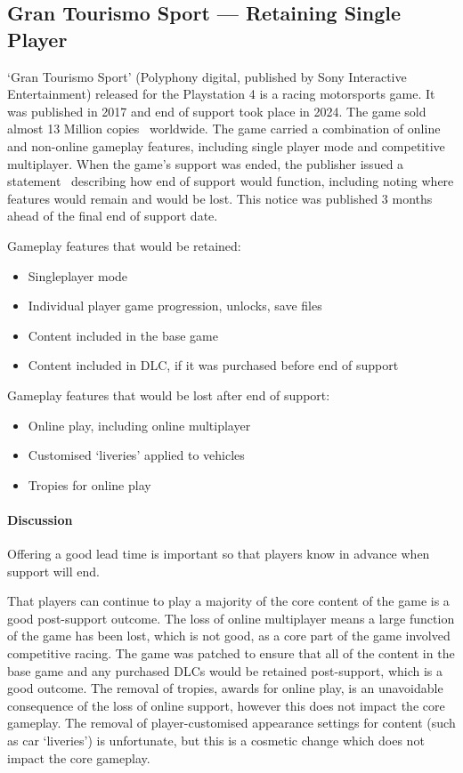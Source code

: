\subsection{Gran Tourismo Sport --- Retaining Single Player}
`Gran Tourismo Sport' (Polyphony digital, published by Sony Interactive Entertainment) released for the Playstation 4 is a racing motorsports game.
It was published in 2017 and end of support took place in 2024.
The game sold almost 13 Million copies~\cite{gtsport-sales-2023} worldwide.
The game carried a combination of online and non-online gameplay features, including single player mode and competitive multiplayer.
When the game's support was ended, the publisher issued a statement~\cite{gtsport-eos-2023} describing how end of support would function,
including noting where features would remain and would be lost.
This notice was published 3 months ahead of the final end of support date.

Gameplay features that would be retained:
\begin{itemize}
    \item Singleplayer mode
    \item Individual player game progression, unlocks, save files
    \item Content included in the base game
    \item Content included in DLC, if it was purchased before end of support
\end{itemize}

Gameplay features that would be lost after end of support:
\begin{itemize}
    \item Online play, including online multiplayer
    \item Customised `liveries' applied to vehicles
    \item Tropies for online play
\end{itemize}

\paragraph*{Discussion}
Offering a good lead time is important so that players know in advance when support will end.

That players can continue to play a majority of the core content of the game is a good post-support outcome.
The loss of online multiplayer means a large function of the game has been lost, which is not good, as a core part of the game involved competitive racing.
The game was patched to ensure that all of the content in the base game and any purchased DLCs would be retained post-support, which is a good outcome.
The removal of tropies, awards for online play, is an unavoidable consequence of the loss of online support, however this does not impact the core gameplay.
The removal of player-customised appearance settings for content (such as car `liveries') is unfortunate, but this is a cosmetic change which does not impact the core gameplay.

